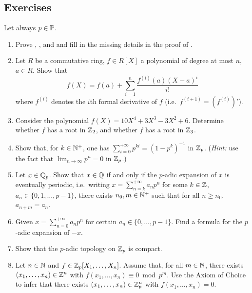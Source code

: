 \documentclass[12pt, leqno, british]{amsart}
\begin{document}
\subsection{Exercises}
Let always $p \in \mathbb P$.
\begin{enumerate}
\item Prove , , and  and fill in the missing details in the proof of .
\item\label{ex:formal-Taylor} Let $R$ be a commutative ring, $f \in R[X]$ a polynomial of degree at most $n$, $a \in R$.
Show that
\begin{displaymath}
f(X) = f(a) + \sum_{i=1}^n \frac{f^{(i)}(a)(X-a)^i}{i!}
\end{displaymath}
where $f^{(i)}$ denotes the $i$th formal derivative of $f$ (i.e.~$f^{(i+1)} = (f^{(i)})'$).
\item Consider the polynomial $f(X) = 10X^4 + 3X^3 - 3X^2 + 6$.
Determine whether $f$ has a root in $\mathbb Z_2$, and whether $f$ has a root in $\mathbb Z_3$.
\item\label{ex:geometric-series} Show that, for $k \in \mathbb N^+$, one has $\sum_{i=0}^{+\infty} p^{ki} = (1-p^k)^{-1}$ in $\mathbb Z_p$. (\textit{Hint:} use the fact that $\lim_{n \to \infty} p^n = 0$ in $\mathbb Z_p$.)
\item\label{ex:p-adic-periodic} Let $x \in \mathbb Q_p$.
Show that $x \in \mathbb Q$ if and only if the $p$-adic expansion of $x$ is eventually periodic, i.e.~writing $x = \sum_{n=k}^{+\infty} a_np^n$ for some $k \in \mathbb Z$, $a_n \in \lbrace 0, 1, \ldots, p-1 \rbrace$, there exists $n_0, m \in \mathbb N^+$ such that for all $n \geq n_0$, $a_{n+m} = a_n$.
\item Given $x = \sum_{n=0}^{+\infty} a_np^n$ for certain $a_n \in \lbrace 0, \ldots, p-1\rbrace$.
Find a formula for the $p$-adic expansion of $-x$.
\item Show that the $p$-adic topology on $\mathbb Z_p$ is compact.
\item\label{it:solution-patching} Let $n \in \mathbb N$ and $f \in \mathbb Z_p[X_1, \ldots, X_n]$.
Assume that, for all $m \in \mathbb N$, there exists $(x_1, \ldots, x_n) \in \mathbb Z^n$ with $f(x_1, \ldots, x_n) \equiv 0 \bmod p^m$.
Use the Axiom of Choice to infer that there exists $(x_1, \ldots, x_n) \in \mathbb Z_p^n$ with $f(x_1, \ldots, x_n) = 0$.
\end{enumerate}
\end{document}
